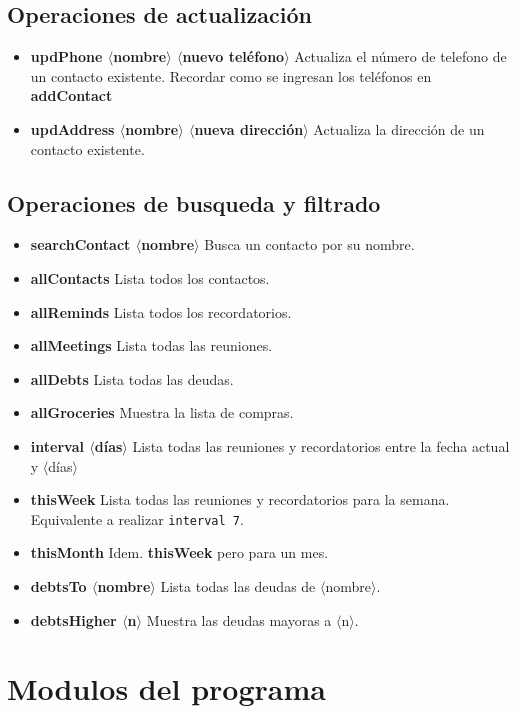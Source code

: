 \documentclass[a4paper,12pt]{article}
\begin{document}
    \subsection*{Operaciones de actualización}
    \begin{itemize}
      \item \textbf{updPhone $\langle$nombre$\rangle$ $\langle$nuevo teléfono$\rangle$} Actualiza el número de telefono de un contacto existente. Recordar como se ingresan los teléfonos en \textbf{addContact}

      \item \textbf{updAddress $\langle$nombre$\rangle$ $\langle$nueva dirección$\rangle$} Actualiza la dirección de un contacto existente.
    \end{itemize}

    \subsection*{Operaciones de busqueda y filtrado}
    \begin{itemize}
      \item \textbf{searchContact $\langle$nombre$\rangle$} Busca un contacto por su nombre.
      \item \textbf{allContacts} Lista todos los contactos.
      \item \textbf{allReminds} Lista todos los recordatorios.
      \item \textbf{allMeetings} Lista todas las reuniones.
      \item \textbf{allDebts} Lista todas las deudas.
      \item \textbf{allGroceries} Muestra la lista de compras.
      \item \textbf{interval $\langle$días$\rangle$} Lista todas las reuniones y recordatorios entre la fecha actual y $\langle$días$\rangle$
      \item \textbf{thisWeek} Lista todas las reuniones y recordatorios para la semana. Equivalente a realizar \texttt{interval 7}.
      \item \textbf{thisMonth} Idem. \textbf{thisWeek} pero para un mes.
      \item \textbf{debtsTo $\langle$nombre$\rangle$} Lista todas las deudas de $\langle$nombre$\rangle$.
      \item \textbf{debtsHigher $\langle$n$\rangle$} Muestra las deudas mayoras a $\langle$n$\rangle$.
    \end{itemize}

    \section*{Modulos del programa}
\end{document}

